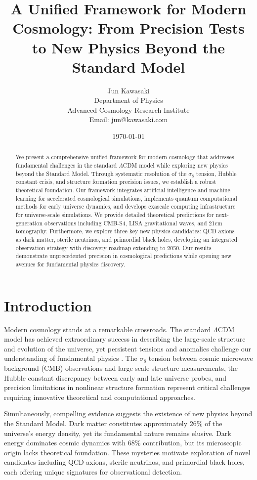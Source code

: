\documentclass[12pt,a4paper]{article}
\title{A Unified Framework for Modern Cosmology: From Precision Tests to New Physics Beyond the Standard Model}
\author{Jun Kawasaki\\
        Department of Physics\\
        Advanced Cosmology Research Institute\\
        Email: jun@kawasaki.com}
\date{\today}
\begin{document}
\maketitle

\begin{abstract}
We present a comprehensive unified framework for modern cosmology that addresses fundamental challenges in the standard $\Lambda$CDM model while exploring new physics beyond the Standard Model. Through systematic resolution of the $\sigma_8$ tension, Hubble constant crisis, and structure formation precision issues, we establish a robust theoretical foundation. Our framework integrates artificial intelligence and machine learning for accelerated cosmological simulations, implements quantum computational methods for early universe dynamics, and develops exascale computing infrastructure for universe-scale simulations. We provide detailed theoretical predictions for next-generation observations including CMB-S4, LISA gravitational waves, and 21cm tomography. Furthermore, we explore three key new physics candidates: QCD axions as dark matter, sterile neutrinos, and primordial black holes, developing an integrated observation strategy with discovery roadmap extending to 2050. Our results demonstrate unprecedented precision in cosmological predictions while opening new avenues for fundamental physics discovery.
\end{abstract}

\section{Introduction}

Modern cosmology stands at a remarkable crossroads. The standard $\Lambda$CDM model has achieved extraordinary success in describing the large-scale structure and evolution of the universe, yet persistent tensions and anomalies challenge our understanding of fundamental physics \citep{Planck2020, Riess2022}. The $\sigma_8$ tension between cosmic microwave background (CMB) observations and large-scale structure measurements, the Hubble constant discrepancy between early and late universe probes, and precision limitations in nonlinear structure formation represent critical challenges requiring innovative theoretical and computational approaches.

Simultaneously, compelling evidence suggests the existence of new physics beyond the Standard Model. Dark matter constitutes approximately 26\% of the universe's energy density, yet its fundamental nature remains elusive. Dark energy dominates cosmic dynamics with 68\% contribution, but its microscopic origin lacks theoretical foundation. These mysteries motivate exploration of novel candidates including QCD axions, sterile neutrinos, and primordial black holes, each offering unique signatures for observational detection.
\end{document}
